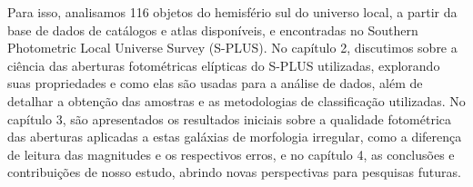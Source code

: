 Para isso, analisamos 116 objetos do hemisfério sul do universo local, a partir da base de dados de catálogos e atlas disponíveis, e encontradas no Southern Photometric Local Universe Survey (S-PLUS). No capítulo 2, discutimos sobre a ciência das aberturas fotométricas elípticas do S-PLUS utilizadas, explorando suas propriedades e como elas são usadas para a análise de dados, além de detalhar a obtenção das amostras e as metodologias de classificação utilizadas. No capítulo 3, são apresentados os resultados iniciais sobre a qualidade fotométrica das aberturas aplicadas a estas galáxias de morfologia irregular, como a diferença de leitura das magnitudes e os respectivos erros, e no capítulo 4, as conclusões e contribuições de nosso estudo, abrindo novas perspectivas para pesquisas futuras.